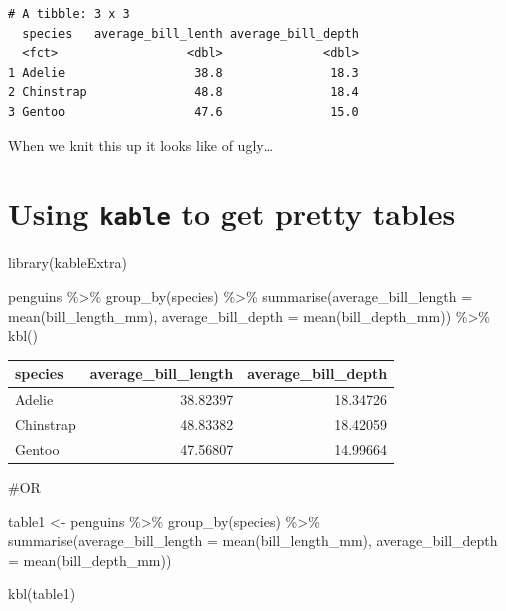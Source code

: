 \documentclass[
  letterpaper,
  DIV=11,
  numbers=noendperiod]{scrartcl}
\newenvironment{Shaded}{\begin{snugshade}}{\end{snugshade}}
\newcommand{\AttributeTok}[1]{\textcolor[rgb]{0.40,0.45,0.13}{#1}}
\newcommand{\CommentTok}[1]{\textcolor[rgb]{0.37,0.37,0.37}{#1}}
\newcommand{\FunctionTok}[1]{\textcolor[rgb]{0.28,0.35,0.67}{#1}}
\newcommand{\NormalTok}[1]{\textcolor[rgb]{0.00,0.23,0.31}{#1}}
\newcommand{\OtherTok}[1]{\textcolor[rgb]{0.00,0.23,0.31}{#1}}
\newcommand{\SpecialCharTok}[1]{\textcolor[rgb]{0.37,0.37,0.37}{#1}}
\begin{document}
\begin{verbatim}
# A tibble: 3 x 3
  species   average_bill_lenth average_bill_depth
  <fct>                  <dbl>              <dbl>
1 Adelie                  38.8               18.3
2 Chinstrap               48.8               18.4
3 Gentoo                  47.6               15.0
\end{verbatim}

When we knit this up it looks like of ugly\ldots{}

\hypertarget{using-kable-to-get-pretty-tables}{%
\section{\texorpdfstring{Using \texttt{kable} to get pretty
tables}{Using kable to get pretty tables}}\label{using-kable-to-get-pretty-tables}}

\begin{Shaded}
\begin{Highlighting}[]
\FunctionTok{library}\NormalTok{(kableExtra)}
\end{Highlighting}
\end{Shaded}

\begin{Shaded}
\begin{Highlighting}[]
\NormalTok{penguins }\SpecialCharTok{\%\textgreater{}\%}
  \FunctionTok{group\_by}\NormalTok{(species) }\SpecialCharTok{\%\textgreater{}\%}
  \FunctionTok{summarise}\NormalTok{(}\AttributeTok{average\_bill\_length =} \FunctionTok{mean}\NormalTok{(bill\_length\_mm), }
            \AttributeTok{average\_bill\_depth =} \FunctionTok{mean}\NormalTok{(bill\_depth\_mm)) }\SpecialCharTok{\%\textgreater{}\%} 
  \FunctionTok{kbl}\NormalTok{()}
\end{Highlighting}
\end{Shaded}

\begin{tabular}[t]{l|r|r}
\hline
species & average\_bill\_length & average\_bill\_depth\\
\hline
Adelie & 38.82397 & 18.34726\\
\hline
Chinstrap & 48.83382 & 18.42059\\
\hline
Gentoo & 47.56807 & 14.99664\\
\hline
\end{tabular}

\begin{Shaded}
\begin{Highlighting}[]
\CommentTok{\#OR }

\NormalTok{table1 }\OtherTok{\textless{}{-}}\NormalTok{ penguins }\SpecialCharTok{\%\textgreater{}\%}
  \FunctionTok{group\_by}\NormalTok{(species) }\SpecialCharTok{\%\textgreater{}\%}
  \FunctionTok{summarise}\NormalTok{(}\AttributeTok{average\_bill\_length =} \FunctionTok{mean}\NormalTok{(bill\_length\_mm), }
            \AttributeTok{average\_bill\_depth =} \FunctionTok{mean}\NormalTok{(bill\_depth\_mm))}

\FunctionTok{kbl}\NormalTok{(table1)}
\end{Highlighting}
\end{Shaded}
\end{document}
